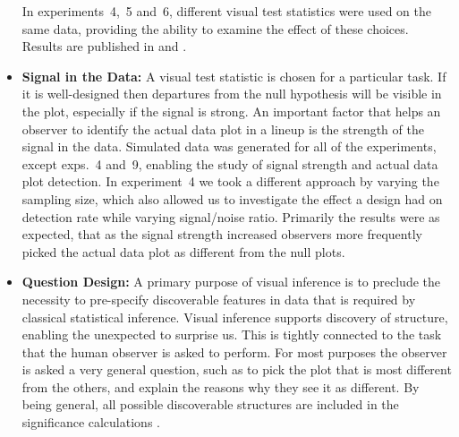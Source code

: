 \documentclass[10pt]{article}\usepackage[]{graphicx}\usepackage[]{color}
\begin{document}
\begin{itemize}
In experiments~4,~5 and~6, different visual test statistics were used on the same data, providing the ability to examine the effect of these choices. Results are published in \cite{heike:2012} and \cite{boxplots:arxiv}. 

\item{\bf Signal in the Data:}
A visual test statistic is chosen for a particular task. If it is well-designed then departures from the null hypothesis will be visible in the plot, especially if the signal is strong. An important factor that helps an observer to identify the actual data plot in a lineup is the strength of the signal in the data. Simulated data was generated for all of the experiments, except exps.~4 and~9, enabling the study of signal strength and actual data plot detection. In experiment~4 we took a different approach by varying the sampling size, which also allowed us to investigate the effect a design had on detection rate while varying signal/noise ratio. Primarily the results were as expected, that as the signal strength increased observers more frequently picked the actual data plot as different from the null plots. 



\item{\bf Question Design:} A primary purpose of visual inference is to preclude the necessity to pre-specify discoverable features in data that is required by classical statistical inference. Visual inference supports discovery of structure, enabling the unexpected to surprise us.  This is tightly connected to the task that the human observer is asked to perform. For most purposes the observer is asked a very general question, such as to pick the plot that is most different from the others, and explain the reasons why they see it as different. By being general, all possible discoverable structures are included in the significance calculations \citep[see also ][]{buja:2009}.


\end{itemize}
\end{document}
